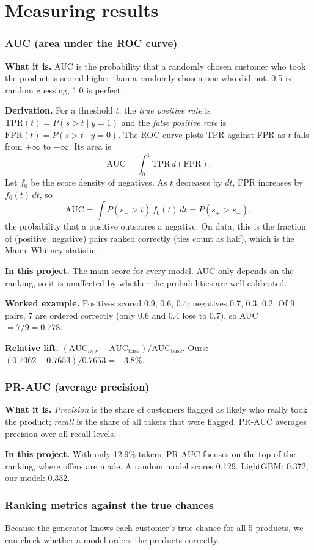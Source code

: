\documentclass[10pt,a4paper]{article}
\newcommand{\what}[1]{\par\textbf{What it is.} #1}
\newcommand{\here}[1]{\par\textbf{In this project.} #1}
\newcommand{\deriv}{\par\textbf{Derivation.} }
\newcommand{\ex}{\par\textbf{Worked example.} }
\begin{document}
\part{Measuring results}
\section{AUC (area under the ROC curve)}
\what{AUC is the probability that a randomly chosen customer who took the product is scored higher than a randomly chosen one who did not. 0.5 is random guessing; 1.0 is perfect.}
\deriv For a threshold $t$, the \emph{true positive rate} is $\text{TPR}(t)=P(s>t\mid y=1)$ and the \emph{false positive rate} is $\text{FPR}(t)=P(s>t\mid y=0)$. The ROC curve plots TPR against FPR as $t$ falls from $+\infty$ to $-\infty$. Its area is
\[\text{AUC}=\int_0^1\text{TPR}\,d(\text{FPR}).\]
Let $f_0$ be the score density of negatives. As $t$ decreases by $dt$, FPR increases by $f_0(t)\,dt$, so
\[\text{AUC}=\int P(s_+>t)\,f_0(t)\,dt=P(s_+>s_-),\]
the probability that a positive outscores a negative. On data, this is the fraction of (positive, negative) pairs ranked correctly (ties count as half), which is the Mann--Whitney statistic.
\here{The main score for every model. AUC only depends on the ranking, so it is unaffected by whether the probabilities are well calibrated.}
\ex Positives scored 0.9, 0.6, 0.4; negatives 0.7, 0.3, 0.2. Of 9 pairs, 7 are ordered correctly (only 0.6 and 0.4 lose to 0.7), so AUC $=7/9=0.778$.

\textbf{Relative lift.} $(\text{AUC}_{\text{new}}-\text{AUC}_{\text{base}})/\text{AUC}_{\text{base}}$. Ours: $(0.7362-0.7653)/0.7653=-3.8\%$.

\section{PR-AUC (average precision)}
\what{\emph{Precision} is the share of customers flagged as likely who really took the product; \emph{recall} is the share of all takers that were flagged. PR-AUC averages precision over all recall levels.}
\here{With only 12.9\% takers, PR-AUC focuses on the top of the ranking, where offers are made. A random model scores 0.129. LightGBM: 0.372; our model: 0.332.}

\section{Ranking metrics against the true chances}
Because the generator knows each customer's true chance for all 5 products, we can check whether a model orders the products correctly.
\end{document}
